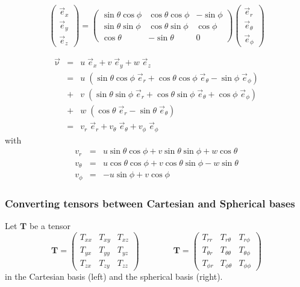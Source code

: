 \[
\left(
\begin{array}{c}
\vec{e}_{x} \\ \vec{e}_y \\ \vec{e}_z
\end{array}
\right)
=
\left(
\begin{array}{ccc}
\sin\theta \cos\phi & \cos\theta\cos\phi & -\sin\phi  \\
\sin\theta \sin\phi & \cos\theta\sin\phi & \cos\phi \\
\cos\theta & -\sin\theta & 0
\end{array}
\right)
\left(
\begin{array}{c}
\vec{e}_{r} \\ \vec{e}_\theta \\ \vec{e}_\phi
\end{array}
\right)
\]

\begin{eqnarray}
\vec{\upnu} 
&=& u\; \vec{e}_x + v \; \vec{e}_y + w \; \vec{e}_z \\
&=& u\; ( \sin\theta \cos\phi \; \vec{e}_r +  \cos\theta\cos\phi \;  \vec{e}_{\theta} -\sin\phi \; \vec{e}_{\phi} ) \\
&+& v\; ( \sin\theta \sin\phi \; \vec{e}_r + \cos\theta\sin\phi \; \vec{e}_\theta  +  \cos\phi \;  \vec{e}_\phi  )  \\
&+& w\; ( \cos\theta \; \vec{e}_r   -\sin\theta \; \vec{e}_\theta  ) \\
&=& v_r\; \vec{e}_r + v_\theta\; \vec{e}_\theta + v_\phi\; \vec{e}_\phi 
\end{eqnarray}
with 
\begin{eqnarray}
v_r      &=&  u \sin \theta  \cos \phi  + v \sin\theta \sin \phi + w \cos\theta \\
v_\theta &=&  u \cos\theta\cos\phi + v \cos\theta\sin\phi -w \sin\theta   \\
v_\phi   &=& -u \sin\phi  + v \cos\phi  
\end{eqnarray}


\subsubsection{Converting tensors between Cartesian and Spherical bases \label{ss:convcartspher}}

Let ${\bm T}$ be a tensor
\[
{\bm T}=
\left(
\begin{array}{ccc}
T_{xx} & T_{xy} & T_{xz} \\
T_{yx} & T_{yy} & T_{yz} \\
T_{zx} & T_{zy} & T_{zz} 
\end{array}
\right)
\qquad\qquad
{\bm T}=
\left(
\begin{array}{ccc}
T_{rr}       & T_{r\theta}      & T_{r\phi} \\
T_{\theta r} & T_{\theta\theta} & T_{\theta\phi} \\
T_{\phi r}   & T_{\phi \theta}  & T_{\phi\phi}
\end{array}
\right)
\]
in the Cartesian basis (left) and the spherical basis (right).


